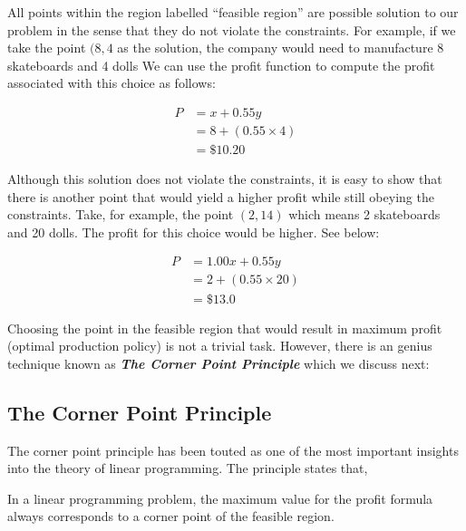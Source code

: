\documentclass[
  letterpaper,
  DIV=11,
  numbers=noendperiod]{scrreprt}
\newenvironment{Shaded}{\begin{snugshade}}{\end{snugshade}}
\newcommand{\DataTypeTok}[1]{\textcolor[rgb]{0.68,0.00,0.00}{#1}}
\newcommand{\ErrorTok}[1]{\textcolor[rgb]{0.68,0.00,0.00}{#1}}
\newcommand{\KeywordTok}[1]{\textcolor[rgb]{0.00,0.23,0.31}{#1}}
\begin{document}
All points within the region labelled ``feasible region'' are possible
solution to our problem in the sense that they do not violate the
constraints. For example, if we take the point \((8,4\) as the solution,
the company would need to manufacture 8 skateboards and 4 dolls We can
use the profit function to compute the profit associated with this
choice as follows:

\begin{align}
P&=x+0.55y\\
&=8+(0.55\times 4)\\
&=\$10.20
\end{align}

Although this solution does not violate the constraints, it is easy to
show that there is another point that would yield a higher profit while
still obeying the constraints. Take, for example, the point \((2,14)\)
which means 2 skateboards and 20 dolls. The profit for this choice would
be higher. See below:

\begin{align}
P&=1.00 x+0.55y\\
&=2+(0.55\times 20)\\
&=\$13.0
\end{align}

Choosing the point in the feasible region that would result in maximum
profit (optimal production policy) is not a trivial task. However, there
is an genius technique known as \textbf{\emph{The Corner Point
Principle}} which we discuss next:

\hypertarget{the-corner-point-principle}{%
\subsection{The Corner Point
Principle}\label{the-corner-point-principle}}

The corner point principle has been touted as one of the most important
insights into the theory of linear programming. The principle states
that,

\begin{Shaded}
\begin{Highlighting}[]
\DataTypeTok{In} \DataTypeTok{a} \DataTypeTok{linear} \DataTypeTok{programming} \DataTypeTok{problem}\ErrorTok{,} \DataTypeTok{the} \DataTypeTok{maximum} \DataTypeTok{value} \DataTypeTok{for} \DataTypeTok{the} \DataTypeTok{profit} \DataTypeTok{formula} \DataTypeTok{always}
\DataTypeTok{corresponds} \DataTypeTok{to} \DataTypeTok{a} \DataTypeTok{corner} \DataTypeTok{point} \DataTypeTok{of} \DataTypeTok{the} \DataTypeTok{feasible} \DataTypeTok{region}\KeywordTok{.}
\end{Highlighting}
\end{Shaded}
\end{document}
